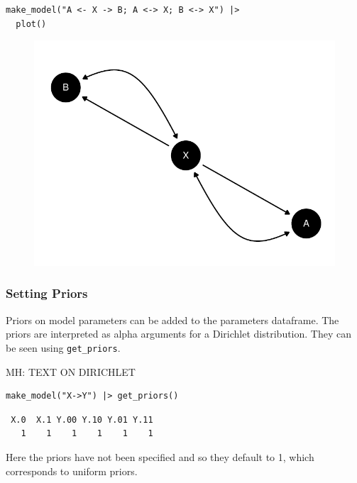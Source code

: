 \documentclass[
  article]{jss}
\begin{document}
\begin{verbatim}
make_model("A <- X -> B; A <-> X; B <-> X") |> 
  plot()
\end{verbatim}

\begin{figure}[H]

{\centering \includegraphics{paper_files/figure-pdf/unnamed-chunk-20-1.pdf}

}

\end{figure}

\hypertarget{priors}{%
\subsubsection{Setting Priors}\label{priors}}

Priors on model parameters can be added to the parameters dataframe. The
priors are interpreted as alpha arguments for a Dirichlet distribution.
They can be seen using \texttt{get\_priors}.

MH: TEXT ON DIRICHLET

\begin{verbatim}
make_model("X->Y") |> get_priors()
\end{verbatim}

\begin{verbatim}
 X.0  X.1 Y.00 Y.10 Y.01 Y.11 
   1    1    1    1    1    1 
\end{verbatim}

Here the priors have not been specified and so they default to 1, which
corresponds to uniform priors.
\end{document}
